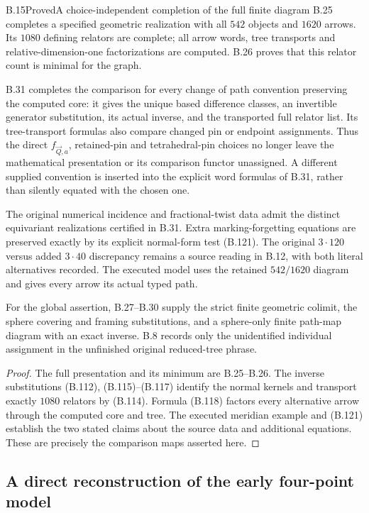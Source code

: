 \begin{result}{B.15}{Proved}{A choice-independent completion of the full finite diagram}
B.25 completes a specified geometric realization with all $542$
objects and $1620$ arrows.  Its $1080$ defining relators are complete;
all arrow words, tree transports and relative-dimension-one
factorizations are computed.  B.26 proves that this relator count
is minimal for the graph.

B.31 completes the comparison for every change of path convention
preserving the computed core: it gives the unique based difference
classes, an invertible generator substitution, its actual inverse,
and the transported full relator list.  Its tree-transport formulas
also compare changed pin or endpoint assignments.  Thus the direct
$f_{\vec Q,a}$, retained-pin and tetrahedral-pin choices no longer
leave the mathematical presentation or its comparison functor
unassigned.  A different supplied convention is inserted into the
explicit word formulas of B.31, rather than silently equated with
the chosen one.

The original numerical incidence and fractional-twist data admit
the distinct equivariant realizations certified in B.31.  Extra
marking-forgetting equations are preserved exactly by its explicit
normal-form test (B.121).  The original $3\cdot120$ versus added
$3\cdot40$ discrepancy remains a source reading in B.12, with both
literal alternatives recorded.  The executed model uses the retained
$542/1620$ diagram and gives every arrow its actual typed path.

For the global assertion, B.27--B.30 supply the strict finite
geometric colimit, the sphere covering and framing substitutions,
and a sphere-only finite path-map diagram with an exact inverse.
B.8 records only the unidentified individual assignment in the
unfinished original reduced-tree phrase.
\end{result}
\begin{proof}
The full presentation and its minimum are B.25--B.26.  The inverse
substitutions (B.112), (B.115)--(B.117) identify the normal kernels
and transport exactly $1080$ relators by (B.114).  Formula (B.118)
factors every alternative arrow through the computed core and tree.
The executed meridian example and (B.121) establish the two stated
claims about the source data and additional equations.  These are
precisely the comparison maps asserted here.
\end{proof}

\subsection{A direct reconstruction of the early four-point model}

